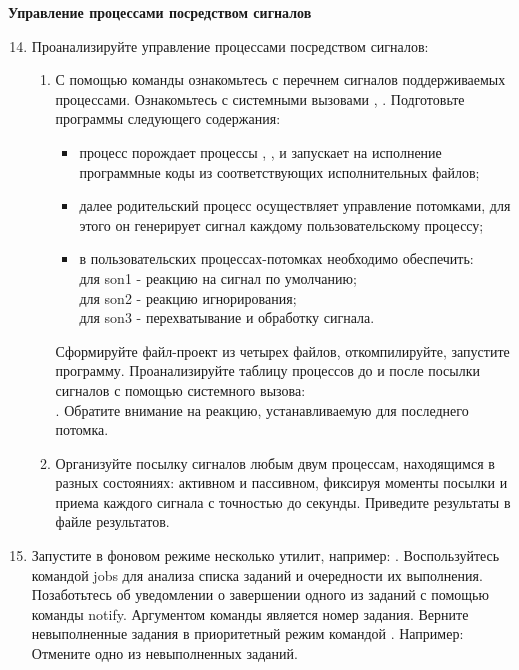 \textbf{Управление процессами посредством сигналов}

\begin{enumerate}
	\setcounter{enumi}{13}
	\item Проанализируйте управление процессами посредством сигналов:
		\begin{enumerate}
			\item С помощью команды  ознакомьтесь с перечнем сигналов поддерживаемых процессами. Ознакомьтесь с системными вызовами , . Подготовьте программы следующего содержания:
				\begin{itemize}
					\item процесс  порождает процессы , ,  и запускает на исполнение программные коды из соответствующих исполнительных файлов;
					\item далее родительский процесс осуществляет управление потомками, для этого он генерирует сигнал каждому пользовательскому процессу;
					\item в пользовательских процессах-потомках необходимо обеспечить: \\для son1 - реакцию на сигнал по умолчанию; \\для son2 - реакцию игнорирования; \\для son3 - перехватывание и обработку сигнала.
				\end{itemize}
			Сформируйте файл-проект из четырех файлов, откомпилируйте, запустите программу. Проанализируйте таблицу процессов до и после посылки сигналов с помощью системного вызова:\\ . Обратите внимание на реакцию, устанавливаемую для последнего
			потомка.
			\item Организуйте посылку сигналов любым двум процессам, находящимся в разных состояниях: активном и пассивном, фиксируя моменты посылки и приема каждого сигнала с точностью до секунды. Приведите результаты в файле результатов.
		\end{enumerate}
	\item Запустите в фоновом режиме несколько утилит, например: . Воспользуйтесь командой jobs для анализа списка заданий и очередности их выполнения. Позаботьтесь об уведомлении о завершении одного из заданий с помощью команды notify. Аргументом команды является номер задания. Верните невыполненные задания в приоритетный режим командой . Например:  Отмените одно из невыполненных заданий.

\end{enumerate}
